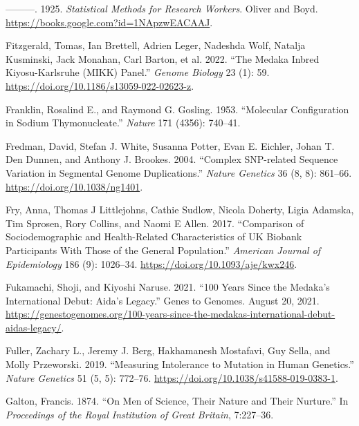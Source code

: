 \documentclass[
]{book}
\newlength{\cslhangindent}
\newlength{\cslentryspacingunit} %
\newenvironment{CSLReferences}[2] %
 {%
  \setlength{\parindent}{0pt}
  \ifodd #1
  \let\oldpar\par
  \def\par{\hangindent=\cslhangindent\oldpar}
  \fi
  \setlength{\parskip}{#2\cslentryspacingunit}
 }%
 {}
\begin{document}
\begin{CSLReferences}{1}{0}
\leavevmode{}%
---------. 1925. \emph{Statistical {Methods} for {Research Workers}}. {Oliver and Boyd}. \url{https://books.google.com?id=1NApzwEACAAJ}.

\leavevmode{}%
Fitzgerald, Tomas, Ian Brettell, Adrien Leger, Nadeshda Wolf, Natalja Kusminski, Jack Monahan, Carl Barton, et al. 2022. {``The {Medaka Inbred Kiyosu-Karlsruhe} ({MIKK}) Panel.''} \emph{Genome Biology} 23 (1): 59. \url{https://doi.org/10.1186/s13059-022-02623-z}.

\leavevmode{}%
Franklin, Rosalind E., and Raymond G. Gosling. 1953. {``Molecular Configuration in Sodium Thymonucleate.''} \emph{Nature} 171 (4356): 740--41.

\leavevmode{}%
Fredman, David, Stefan J. White, Susanna Potter, Evan E. Eichler, Johan T. Den Dunnen, and Anthony J. Brookes. 2004. {``Complex {SNP-related} Sequence Variation in Segmental Genome Duplications.''} \emph{Nature Genetics} 36 (8, 8): 861--66. \url{https://doi.org/10.1038/ng1401}.

\leavevmode{}%
Fry, Anna, Thomas J Littlejohns, Cathie Sudlow, Nicola Doherty, Ligia Adamska, Tim Sprosen, Rory Collins, and Naomi E Allen. 2017. {``Comparison of {Sociodemographic} and {Health-Related Characteristics} of {UK Biobank Participants With Those} of the {General Population}.''} \emph{American Journal of Epidemiology} 186 (9): 1026--34. \url{https://doi.org/10.1093/aje/kwx246}.

\leavevmode{}%
Fukamachi, Shoji, and Kiyoshi Naruse. 2021. {``100 Years Since the Medaka's International Debut: {Aida}'s Legacy.''} {Genes to Genomes}. August 20, 2021. \url{https://genestogenomes.org/100-years-since-the-medakas-international-debut-aidas-legacy/}.

\leavevmode{}%
Fuller, Zachary L., Jeremy J. Berg, Hakhamanesh Mostafavi, Guy Sella, and Molly Przeworski. 2019. {``Measuring Intolerance to Mutation in Human Genetics.''} \emph{Nature Genetics} 51 (5, 5): 772--76. \url{https://doi.org/10.1038/s41588-019-0383-1}.

\leavevmode{}%
Galton, Francis. 1874. {``On {Men} of {Science}, Their {Nature} and Their {Nurture}.''} In \emph{Proceedings of the {Royal Institution} of {Great Britain}}, 7:227--36.


\end{CSLReferences}
\end{document}
